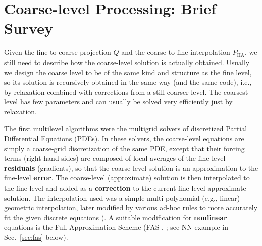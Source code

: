 \documentclass{article} %
\begin{document}

\section{Coarse-level Processing: Brief Survey}
\label{sec:coarse_overview}
Given the fine-to-coarse projection $Q$ and the coarse-to-fine interpolation $P_{\text{HA}}$, we still need to describe how the coarse-level solution is actually obtained. Usually we design the coarse level to be of the same kind and structure as the fine level, so its solution is recursively obtained in the same way (and the same code), i.e., by relaxation combined with corrections from a still coarser level. The coarsest level has few parameters and can usually be solved very efficiently just by relaxation.

The first multilevel algorithms were the multigrid solvers of discretized Partial Differential Equations (PDEs). In these solvers, the coarse-level equations are simply a coarse-grid discretization of the same PDE, except that their forcing terms (right-hand-sides) are composed of local averages of the fine-level \textbf{residuals} (gradients), so that the coarse-level solution is an approximation to the fine-level \textbf{error}. The coarse-level (approximate) solution is then interpolated to the fine level and added as a \textbf{correction} to the current fine-level approximate solution. The interpolation used was a simple multi-polynomial (e.g., linear) geometric interpolation, later modified by various ad-hoc rules to more accurately fit the given discrete equations \cite{mg_discontinous}). A suitable modification for \textbf{nonlinear} equations is the Full Approximation Scheme (FAS \cite{brandt77}, \cite[Sec.~8]{guide}; see NN example in Sec.~\ref{sec:fas} below).
\end{document}
